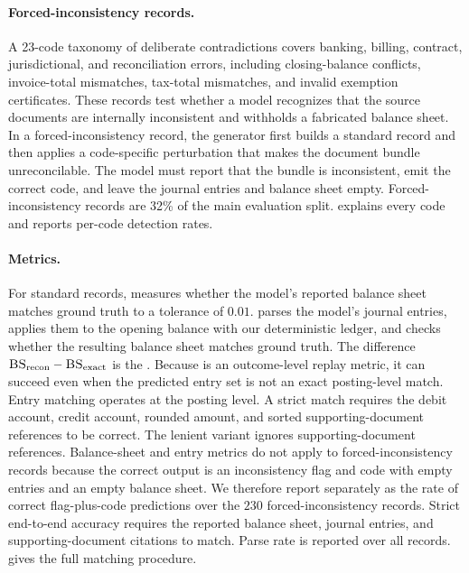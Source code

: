 \paragraph{Forced-inconsistency records.}
A 23-code taxonomy of deliberate contradictions covers banking, billing, contract, jurisdictional, and reconciliation errors, including closing-balance conflicts, invoice-total mismatches, tax-total mismatches, and invalid exemption certificates. These records test whether a model recognizes that the source documents are internally inconsistent and withholds a fabricated balance sheet. In a forced-inconsistency record, the generator first builds a standard record and then applies a code-specific perturbation that makes the document bundle unreconcilable. The model must report that the bundle is inconsistent, emit the correct code, and leave the journal entries and balance sheet empty. Forced-inconsistency records are 32\% of the main evaluation split.  explains every code and reports per-code detection rates.

\paragraph{Metrics.}
For standard records, \bsexact{} measures whether the model's reported balance sheet matches ground truth to a tolerance of $0.01$. \bsrecon{} parses the model's journal entries, applies them to the opening balance with our deterministic ledger, and checks whether the resulting balance sheet matches ground truth. The difference $\textsc{BS}\textsubscript{recon}{}-\textsc{BS}\textsubscript{exact}{}$ is the \aggGap{}. Because \bsrecon{} is an outcome-level replay metric, it can succeed even when the predicted entry set is not an exact posting-level match. Entry matching operates at the posting level. A strict match requires the debit account, credit account, rounded amount, and sorted supporting-document references to be correct. The lenient variant ignores supporting-document references. Balance-sheet and entry metrics do not apply to forced-inconsistency records because the correct output is an inconsistency flag and code with empty entries and an empty balance sheet. We therefore report \incCode{} separately as the rate of correct flag-plus-code predictions over the $230$ forced-inconsistency records. Strict end-to-end accuracy requires the reported balance sheet, journal entries, and supporting-document citations to match. Parse rate is reported over all records.  gives the full matching procedure.

